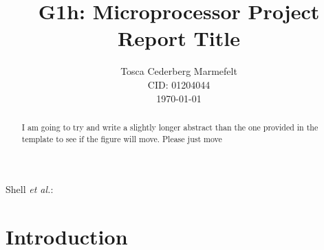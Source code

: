 \documentclass[journal]{Imperial_lab_report}
\begin{document}
%
\title{G1h: Microprocessor Project Report Title}


\author{Tosca Cederberg Marmefelt\\
	CID: 01204044\\
\today}%




%
{Shell \MakeLowercase{\textit{et al.}}:}
% 











\maketitle

\begin{abstract}
I am going to try and write a slightly longer abstract than the one provided in the template to see if the figure will move. Please just move
\end{abstract}


\section{Introduction}
\end{document}
